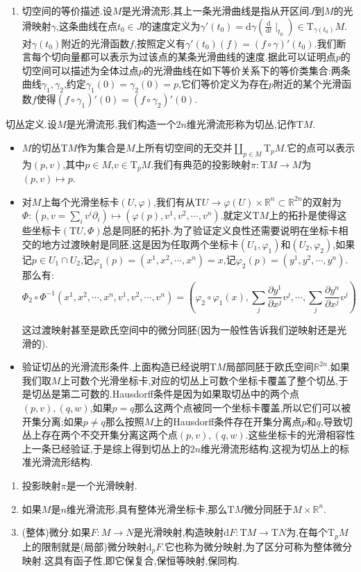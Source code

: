 \begin{enumerate}
    \item 切空间的等价描述.设$M$是光滑流形,其上一条光滑曲线是指从开区间$J$到$M$的光滑映射$\gamma$,这条曲线在点$t_0\in J$的速度定义为$\gamma'(t_0)=\mathrm{d}\gamma\left(\frac{\mathrm{d}}{\mathrm{d}t}\mid_{t_0}\right)\in\mathrm{T}_{\gamma(t_0)}M$.对$\gamma(t_0)$附近的光滑函数$f$,按照定义有$\gamma'(t_0)(f)=(f\circ\gamma)'(t_0)$.我们断言每个切向量都可以表示为过该点的某条光滑曲线的速度.据此可以证明点$p$的切空间可以描述为全体过点$p$的光滑曲线在如下等价关系下的等价类集合:两条曲线$\gamma_1,\gamma_2$,约定$\gamma_1(0)=\gamma_2(0)=p$,它们等价定义为存在$p$附近的某个光滑函数$f$使得$(f\circ\gamma_1)'(0)=(f\circ\gamma_2)'(0)$.
\end{enumerate}

切丛定义.设$M$是光滑流形,我们构造一个$2n$维光滑流形称为切丛,记作$\mathrm{T}M$.
\begin{itemize}
	\item $M$的切丛$\mathrm{T}M$作为集合是$M$上所有切空间的无交并$\coprod_{p\in M}\mathrm{T}_pM$.它的点可以表示为$(p,v)$,其中$p\in M$,$v\in\mathrm{T}_pM$.我们有典范的投影映射$\pi:\mathrm{T}M\to M$为$(p,v)\mapsto p$.
	\item 对$M$上每个光滑坐标卡$(U,\varphi)$,我们有从$\mathrm{T}U\to\varphi(U)\times\mathbb{R}^n\subset\mathbb{R}^{2n}$的双射为$\Phi:(p,v=\sum_iv^i\partial_i)\mapsto(\varphi(p),v^1,v^2,\cdots,v^n)$.就定义$\mathrm{T}M$上的拓扑是使得这些坐标卡$(\mathrm{T}U,\Phi)$总是同胚的拓扑.为了验证定义良性还需要说明在坐标卡相交的地方过渡映射是同胚,这是因为任取两个坐标卡$(U_1,\varphi_1)$和$(U_2,\varphi_2)$,如果记$p\in U_1\cap U_2$,记$\varphi_1(p)=(x^1,x^2,\cdots,x^n)=x$,记$\varphi_2(p)=(y^1,y^2,\cdots,y^n)$.那么有:
	$$\Phi_2\circ\Phi^{-1}(x^1,x^2,\cdots,x^n,v^1,v^2,\cdots,v^n)=\left(\varphi_2\circ\varphi_1(x),\sum_j\frac{\partial y^1}{\partial x^j}v^j,\cdots,\sum_j\frac{\partial y^n}{\partial x^j}v^j\right)$$
	
	这过渡映射甚至是欧氏空间中的微分同胚(因为一般性告诉我们逆映射还是光滑的).
	\item 验证切丛的光滑流形条件.上面构造已经说明$\mathrm{T}M$局部同胚于欧氏空间$\mathbb{R}^{2n}$.如果我们取$M$上可数个光滑坐标卡,对应的切丛上可数个坐标卡覆盖了整个切丛,于是切丛是第二可数的.Hausdorff条件是因为如果取切丛中的两个点$(p,v),(q,w)$,如果$p=q$那么这两个点被同一个坐标卡覆盖,所以它们可以被开集分离;如果$p\not=q$那么按照$M$上的Hausdorff条件存在开集分离点$p$和$q$,导致切丛上存在两个不交开集分离这两个点$(p,v),(q,w)$.这些坐标卡的光滑相容性上一条已经验证,于是综上得到切丛上的$2n$维光滑流形结构,这视为切丛上的标准光滑流形结构.
\end{itemize}
\begin{enumerate}
	\item 投影映射$\pi$是一个光滑映射.
	\item 如果$M$是$n$维光滑流形,具有整体光滑坐标卡,那么$\mathrm{T}M$微分同胚于$M\times\mathbb{R}^n$.
	\item (整体)微分.如果$F:M\to N$是光滑映射,构造映射$\mathrm{d}F:\mathrm{T}M\to\mathrm{T}N$为,在每个$\mathrm{T}_pM$上的限制就是(局部)微分映射$\mathrm{d}_pF$.它也称为微分映射,为了区分可称为整体微分映射.这具有函子性,即它保复合,保恒等映射,保同构.
\end{enumerate}


